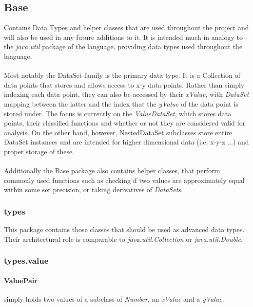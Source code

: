 \documentclass[main.tex]{subfiles}
\begin{document}
    \subsection{Base}
    
      Contains Data Types and helper classes that are used throughout the project and will also be used in any future additions to it. It is intended much in analogy to the \emph{java.util} package of the language, providing data types used throughout the language. 
      \\\\
      Most notably the DataSet family is the primary data type. It is a Collection of data points that stores and allows access to x-y data points. Rather than simply indexing each data point, they can also be accessed by their \emph{xValue}, with \textit{DataSet} mapping between the latter and the index that the \emph{yValue} of the data point is stored under. The focus is currently on the \textit{ValueDataSet}, which stores data points, their classified functions and whether or not they are considered valid for analysis. On the other hand, however, NestedDataSet subclasses store entire DataSet instances and are intended for higher dimensional data (i.e. x-y-z ...) and proper storage of these.
      \\\\
      Additionally the Base package also contains helper classes, that perform commonly used functions such as checking if two values are approximately equal within some set precision, or taking derivatives of \textit{DataSets}.
      
      \subsubsection*{types}
        
        This package contains those classes that should be used as advanced data types. Their architectural role is comparable to \textit{java.util.Collection} or \textit{java.util.Double}.
        
      \subsubsection*{types.value}
        
        \paragraph{ValuePair} simply holds two values of a subclass of \textit{Number}, an \textit{xValue} and a \textit{yValue}.
        
\end{document}
